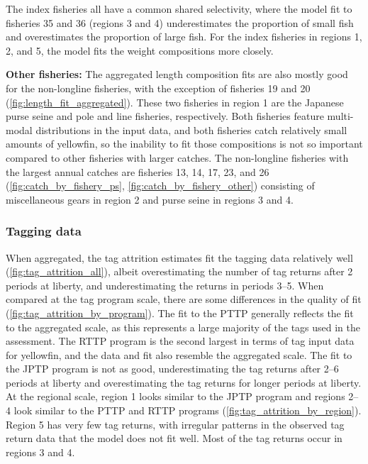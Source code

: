 The index fisheries all have a common shared selectivity, where the model fit to fisheries 35 and 36 (regions 3 and 4) underestimates the proportion of small fish and overestimates the proportion of large fish. For the index fisheries in regions 1, 2, and 5, the model fits the weight compositions more closely.

\textbf{Other fisheries:} The aggregated length composition fits are also mostly good for the non-longline fisheries, with the exception of fisheries 19 and 20 (\autoref{fig:length_fit_aggregated}). These two fisheries in region 1 are the Japanese purse seine and pole and line fisheries, respectively. Both fisheries feature multi-modal distributions in the input data, and both fisheries catch relatively small amounts of yellowfin, so the inability to fit those compositions is not so important compared to other fisheries with larger catches. The non-longline fisheries with the largest annual catches are fisheries 13, 14, 17, 23, and 26 (\autoref{fig:catch_by_fishery_ps}, \autoref{fig:catch_by_fishery_other}) consisting of miscellaneous gears in region 2 and purse seine in regions 3 and 4.

\subsubsection{Tagging data}
\label{sec:fit_tagging}

When aggregated, the tag attrition estimates fit the tagging data relatively well (\autoref{fig:tag_attrition_all}), albeit overestimating the number of tag returns after 2 periods at liberty, and underestimating the returns in periods 3--5. When compared at the tag program scale, there are some differences in the quality of fit (\autoref{fig:tag_attrition_by_program}). The fit to the PTTP generally reflects the fit to the aggregated scale, as this represents a large majority of the tags used in the assessment. The RTTP program is the second largest in terms of tag input data for yellowfin, and the data and fit also resemble the aggregated scale. The fit to the JPTP program is not as good, underestimating the tag returns after 2--6 periods at liberty and overestimating the tag returns for longer periods at liberty. At the regional scale, region 1 looks similar to the JPTP program and regions 2--4 look similar to the PTTP and RTTP programs (\autoref{fig:tag_attrition_by_region}). Region 5 has very few tag returns, with irregular patterns in the observed tag return data that the model does not fit well. Most of the tag returns occur in regions 3 and 4.

